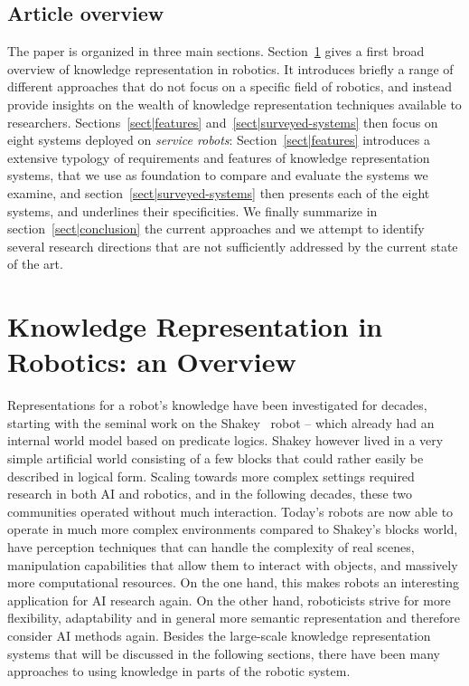 \documentclass[journal]{IEEEtran}
\begin{document}
\subsection{Article overview}
\label{sect|overview}

The paper is organized in three main sections.
% 
Section~\ref{sect|krsoverview} gives a first broad overview of knowledge
representation in robotics. It introduces briefly a range of different
approaches that do not focus on a specific field of robotics, and instead
provide insights on the wealth of knowledge representation techniques available
to researchers.
% 
Sections~\ref{sect|features} and~\ref{sect|surveyed-systems} then focus on eight
systems deployed on \emph{service robots}: Section~\ref{sect|features}
introduces a extensive typology of requirements and features of knowledge
representation systems, that we use as foundation to compare and evaluate the
systems we examine, and section~\ref{sect|surveyed-systems} then presents each
of the eight systems, and underlines their specificities.
% 
We finally summarize in section~\ref{sect|conclusion} the current approaches and
we attempt to identify several research directions that are not sufficiently
addressed by the current state of the art.



\section{Knowledge Representation in Robotics: an Overview}
\label{sect|krsoverview}

Representations for a robot's knowledge have been investigated for decades, 
starting with the seminal work on the Shakey~\cite{nilsson84shakey} robot --
which already had an internal world model based on predicate logics. Shakey
however lived in a very simple artificial world consisting of a few blocks
that could rather easily be described in logical form. Scaling towards more
complex settings required research in both AI and robotics, and in the 
following decades, these two communities operated without much interaction.
Today's robots are now able to operate in much more complex environments 
compared to Shakey's blocks world, have perception techniques that can handle 
the complexity of real scenes, manipulation capabilities that allow them to 
interact with objects, and massively more computational resources. On the one 
hand, this makes robots an interesting application for AI research again. On
the other hand, roboticists strive for more flexibility, adaptability and in 
general more semantic representation and therefore consider AI methods again. 
Besides the large-scale knowledge representation systems that will be discussed 
in the following sections, there have been many approaches to using knowledge
in parts of the robotic system.
\end{document}

